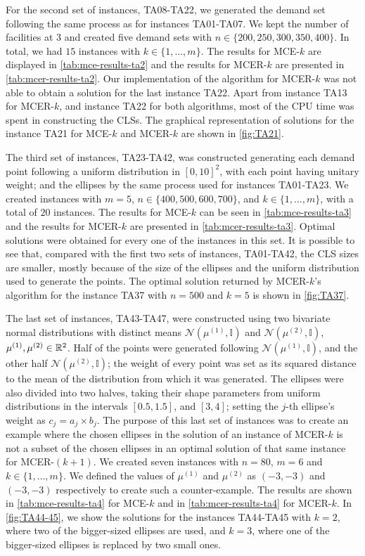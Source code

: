 For the second set of instances, TA08-TA22, we generated the demand set following the same process as for instances TA01-TA07.
We kept the number of facilities at $3$ and created five demand sets with $n\in\{200, 250, 300, 350, 400\}$. In total, we had $15$ instances with $k\in\{1, \dots, m\}$. The results for MCE-$k$ are displayed in \autoref{tab:mce-results-ta2} and the results for MCER-$k$ are presented in \autoref{tab:mcer-results-ta2}.
Our implementation of the algorithm for MCER-$k$ was not able to obtain a solution for the last instance TA22. Apart from instance TA13 for MCER-$k$, and instance TA22 for both algorithms, most of the CPU time was spent in constructing the CLSs.
The graphical representation of solutions for the instance TA21 for MCE-$k$ and MCER-$k$ are shown in \autoref{fig:TA21}.

The third set of instances, TA23-TA42, was constructed generating each demand point following a uniform distribution in $[0, 10]^2$, with each point having unitary weight; and the ellipses by the same process used for instances TA01-TA23. We created instances with $m=5$, $n\in \{400, 500, 600, 700\}$, and $k\in\{1, \dots, m\}$, with a total of $20$ instances. The results for MCE-$k$ can be seen in \autoref{tab:mce-results-ta3} and the results for MCER-$k$ are presented in \autoref{tab:mcer-results-ta3}. Optimal solutions were obtained for every one of the instances in this set. It is possible to see that, compared with the first two sets of instances, TA01-TA42, the CLS sizes are smaller, mostly because of the size of the ellipses and the uniform distribution used to generate the points. The optimal solution returned by MCER-$k$'s algorithm for the instance TA37 with $n=500$ and $k=5$ is shown in \autoref{fig:TA37}.

The last set of instances, TA43-TA47, were constructed using two bivariate normal distributions with distinct means $\mathcal{N}(\mu^{(1)}, \mathbb{I})$ and $\mathcal{N}(\mu^{(2)}, \mathbb{I})$, $\mu^{(1)}, \mu^{(2)} \in \mathbb{R}^2$. Half of the points were generated following $\mathcal{N}(\mu^{(1)}, \mathbb{I})$, and the other half $\mathcal{N}(\mu^{(2)}, \mathbb{I})$; the weight of every point was set as its squared distance to the mean of the distribution from which it was generated.
The ellipses were also divided into two halves, taking their shape parameters from uniform distributions in the intervals $[0.5, 1.5]$, and $[3, 4]$; setting the $j$-th ellipse's weight as $c_j=a_j \times b_j$.
The purpose of this last set of instances was to create an example where the chosen ellipses in the solution of an instance of MCER-$k$ is not a subset of the chosen ellipses in an optimal solution of that same instance for MCER-$(k+1)$. We created seven instances with $n=80$, $m=6$ and $k\in\{1, \dots, m\}$. We defined the values of $\mu^{(1)}$ and $\mu^{(2)}$ as $(-3, -3)$ and $(-3, -3)$ respectively to create such a counter-example. The results are shown in \autoref{tab:mce-results-ta4} for MCE-$k$ and in \autoref{tab:mcer-results-ta4} for MCER-$k$.
In \autoref{fig:TA44-45}, we show the solutions for the instances TA44-TA45 with $k=2$, where two of the bigger-sized ellipses are used, and $k=3$, where one of the bigger-sized ellipses is replaced by two small ones.

